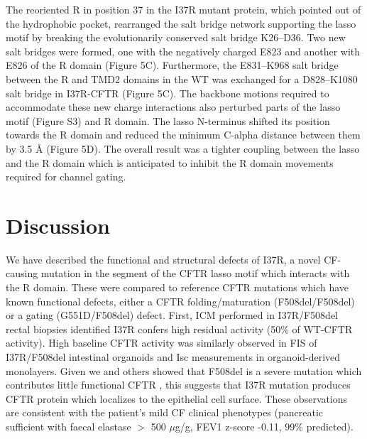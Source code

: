 The reoriented R in position 37 in the I37R mutant protein, which pointed out of the hydrophobic pocket, rearranged the salt bridge network supporting the lasso motif by breaking the evolutionarily conserved salt bridge K26–D36. Two new salt bridges were formed, one with the negatively charged E823 and another with E826 of the R domain (Figure 5C). Furthermore, the E831–K968 salt bridge between the R and TMD2 domains in the WT was exchanged for a D828–K1080 salt bridge in I37R-CFTR (Figure 5C). The backbone motions required to accommodate these new charge interactions also perturbed parts of the lasso motif (Figure S3) and R domain. The lasso N-terminus shifted its position towards the R domain and reduced the minimum C-alpha distance between them by 3.5 $\mbox{\AA}$ (Figure 5D). The overall result was a tighter coupling between the lasso and the R domain which is anticipated to inhibit the R domain movements required for channel gating.

\section{Discussion}

We have described the functional and structural defects of I37R, a novel CF-causing mutation in the segment of the CFTR lasso motif which interacts with the R domain. These were compared to reference CFTR mutations which have known functional defects, either a CFTR folding/maturation (F508del/F508del) or a gating (G551D/F508del) defect. First, ICM performed in I37R/F508del rectal biopsies identified I37R confers high residual activity (50\% of WT-CFTR activity). High baseline CFTR activity was similarly observed in FIS of I37R/F508del intestinal organoids and Isc measurements in organoid-derived monolayers. Given we and others showed that F508del is a severe mutation which contributes little functional CFTR \cite{vangoor2011}, this suggests that I37R mutation produces CFTR protein which localizes to the epithelial cell surface. These observations are consistent with the patient's mild CF clinical phenotypes (pancreatic sufficient with faecal elastase $>$ 500 $\mu$g/g, FEV1 z-score -0.11, 99\% predicted).


